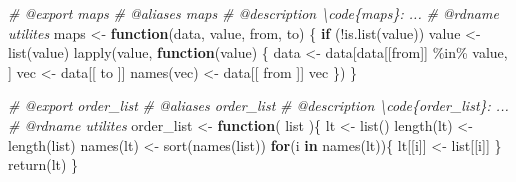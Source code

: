 \documentclass[
]{article}
\newenvironment{Shaded}{\begin{snugshade}}{\end{snugshade}}
\newcommand{\CommentTok}[1]{\textcolor[rgb]{0.56,0.35,0.01}{\textit{#1}}}
\newcommand{\ControlFlowTok}[1]{\textcolor[rgb]{0.13,0.29,0.53}{\textbf{#1}}}
\newcommand{\FunctionTok}[1]{\textcolor[rgb]{0.00,0.00,0.00}{#1}}
\newcommand{\NormalTok}[1]{#1}
\newcommand{\OtherTok}[1]{\textcolor[rgb]{0.56,0.35,0.01}{#1}}
\newcommand{\SpecialCharTok}[1]{\textcolor[rgb]{0.00,0.00,0.00}{#1}}
\begin{document}
\begin{Shaded}
\begin{Highlighting}[]
\CommentTok{\#\textquotesingle{} @export maps}
\CommentTok{\#\textquotesingle{} @aliases maps}
\CommentTok{\#\textquotesingle{} @description \textbackslash{}code\{maps\}: ...}
\CommentTok{\#\textquotesingle{} @rdname utilites}
\NormalTok{maps }\OtherTok{\textless{}{-}} \ControlFlowTok{function}\NormalTok{(data, value, from, to) \{}
  \ControlFlowTok{if}\NormalTok{ (}\SpecialCharTok{!}\FunctionTok{is.list}\NormalTok{(value))}
\NormalTok{    value }\OtherTok{\textless{}{-}} \FunctionTok{list}\NormalTok{(value)}
  \FunctionTok{lapply}\NormalTok{(value,}
         \ControlFlowTok{function}\NormalTok{(value) \{}
\NormalTok{           data }\OtherTok{\textless{}{-}}\NormalTok{ data[data[[from]] }\SpecialCharTok{\%in\%}\NormalTok{ value, ]}
\NormalTok{           vec }\OtherTok{\textless{}{-}}\NormalTok{ data[[ to ]]}
           \FunctionTok{names}\NormalTok{(vec) }\OtherTok{\textless{}{-}}\NormalTok{ data[[ from ]]}
\NormalTok{           vec}
\NormalTok{         \})}
\NormalTok{\}}

\CommentTok{\#\textquotesingle{} @export order\_list}
\CommentTok{\#\textquotesingle{} @aliases order\_list}
\CommentTok{\#\textquotesingle{} @description \textbackslash{}code\{order\_list\}: ...}
\CommentTok{\#\textquotesingle{} @rdname utilites}
\NormalTok{order\_list }\OtherTok{\textless{}{-}} 
  \ControlFlowTok{function}\NormalTok{(}
\NormalTok{           list}
\NormalTok{           )\{}
\NormalTok{    lt }\OtherTok{\textless{}{-}} \FunctionTok{list}\NormalTok{()}
    \FunctionTok{length}\NormalTok{(lt) }\OtherTok{\textless{}{-}} \FunctionTok{length}\NormalTok{(list)}
    \FunctionTok{names}\NormalTok{(lt) }\OtherTok{\textless{}{-}} \FunctionTok{sort}\NormalTok{(}\FunctionTok{names}\NormalTok{(list))}
    \ControlFlowTok{for}\NormalTok{(i }\ControlFlowTok{in} \FunctionTok{names}\NormalTok{(lt))\{}
\NormalTok{      lt[[i]] }\OtherTok{\textless{}{-}}\NormalTok{ list[[i]]}
\NormalTok{    \}}
    \FunctionTok{return}\NormalTok{(lt)}
\NormalTok{  \}}


\end{Highlighting}
\end{Shaded}
\end{document}
